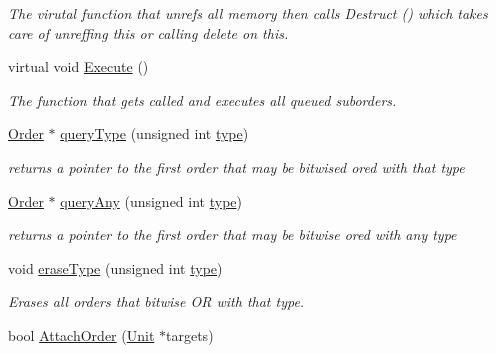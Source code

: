 \begin{DoxyCompactItemize}
\begin{DoxyCompactList}\small\item\em The virutal function that unrefs all memory then calls Destruct () which takes care of unreffing this or calling delete on this. \end{DoxyCompactList}\item 
virtual void \hyperlink{classOrder_abcab68df8e1fdb17cad57307cea7966f}{Execute} ()\hypertarget{classOrder_abcab68df8e1fdb17cad57307cea7966f}{}\label{classOrder_abcab68df8e1fdb17cad57307cea7966f}

\begin{DoxyCompactList}\small\item\em The function that gets called and executes all queued suborders. \end{DoxyCompactList}\item 
\hyperlink{classOrder}{Order} $\ast$ \hyperlink{classOrder_aeb3ab2de81765654ae2dc02da565b11e}{query\+Type} (unsigned int \hyperlink{classOrder_a66fec15be8c023a4b1b0a976eeeee266}{type})\hypertarget{classOrder_aeb3ab2de81765654ae2dc02da565b11e}{}\label{classOrder_aeb3ab2de81765654ae2dc02da565b11e}

\begin{DoxyCompactList}\small\item\em returns a pointer to the first order that may be bitwised ored with that type \end{DoxyCompactList}\item 
\hyperlink{classOrder}{Order} $\ast$ \hyperlink{classOrder_adb6026a4fe5a4c51808bb8c66e2fcc21}{query\+Any} (unsigned int \hyperlink{classOrder_a66fec15be8c023a4b1b0a976eeeee266}{type})\hypertarget{classOrder_adb6026a4fe5a4c51808bb8c66e2fcc21}{}\label{classOrder_adb6026a4fe5a4c51808bb8c66e2fcc21}

\begin{DoxyCompactList}\small\item\em returns a pointer to the first order that may be bitwise ored with any type \end{DoxyCompactList}\item 
void \hyperlink{classOrder_ad1bf0e4f383e125ec90aab70fcd54f11}{erase\+Type} (unsigned int \hyperlink{classOrder_a66fec15be8c023a4b1b0a976eeeee266}{type})\hypertarget{classOrder_ad1bf0e4f383e125ec90aab70fcd54f11}{}\label{classOrder_ad1bf0e4f383e125ec90aab70fcd54f11}

\begin{DoxyCompactList}\small\item\em Erases all orders that bitwise OR with that type. \end{DoxyCompactList}\item 
bool \hyperlink{classOrder_a465da9fcb9219e1821010ba493f0f3a7}{Attach\+Order} (\hyperlink{classUnit}{Unit} $\ast$targets)\hypertarget{classOrder_a465da9fcb9219e1821010ba493f0f3a7}{}\label{classOrder_a465da9fcb9219e1821010ba493f0f3a7}


\end{DoxyCompactItemize}
